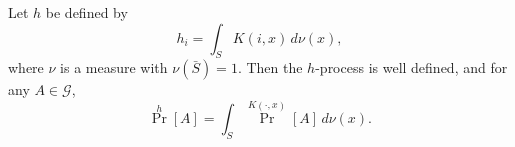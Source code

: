 Let $h$ be defined by
$$h_i = \int_{S} K(i, x) \, d\nu(x),$$
where $\nu$ is a measure with $\nu(\bar{S}) = 1$. Then the $h$-process is well defined, and for any $A \in \mathcal{G}$,
$$\Pr^h[A] = \int_{S} \Pr^{K(\cdot, x)}[A] \, d\nu(x).$$
